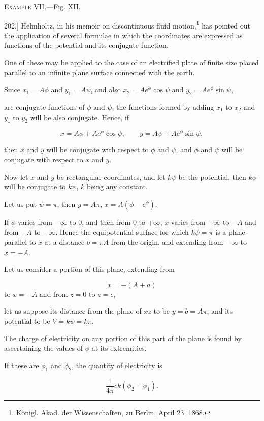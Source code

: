 \documentclass[11pt,a4paper]{article}
\begin{document}
\begin{center}
\textsc{Example VII.}---Fig. XII.
\end{center}

202.] Helmholtz, in his memoir on discontinuous fluid motion,\footnote{K\"onigl. Akad. der Wissenschaften, zu Berlin, April 23, 1868.}
has pointed out the application of several formulae in which the
coordinates are expressed as functions of the potential and its
conjugate function.

One of these may be applied to the case of an electrified plate of
finite size placed parallel to an infinite plane surface connected with
the earth.

Since $x_1=A\phi$ and $y_1=A\psi$, and also
$x_2=Ae^\phi\cos\psi$ and $y_2=Ae^\phi\sin\psi$,

are conjugate functions of $\phi$ and $\psi$, the functions formed by
adding $x_1$ to $x_2$ and $y_1$ to $y_2$ will be also conjugate.
Hence, if

\[
x=A\phi+Ae^\phi\cos\psi,\qquad
y=A\psi+Ae^\phi\sin\psi,
\]

then $x$ and $y$ will be conjugate with respect to $\phi$ and $\psi$,
and $\phi$ and $\psi$ will be conjugate with respect to $x$ and $y$.

Now let $x$ and $y$ be rectangular coordinates, and let $k\psi$ be the
potential, then $k\phi$ will be conjugate to $k\psi$, $k$ being any
constant.

Let us put $\psi=\pi$, then $y=A\pi$, $x=A(\phi-e^\phi)$.

If $\phi$ varies from $-\infty$ to 0, and then from 0 to $+\infty$,
$x$ varies from $-\infty$ to $-A$ and from $-A$ to $-\infty$. Hence the
equipotential surface for which $k\psi=\pi$ is a plane parallel to $x$
at a distance $b=\pi A$ from the origin, and extending from $-\infty$
to $x=-A$.

Let us consider a portion of this plane, extending from

\[
x=-(A+a)
\]
to $x=-A$ and from $z=0$ to $z=c$,

let us suppose its distance from the plane of $xz$ to be $y=b=A\pi$,
and its potential to be $V=k\psi=k\pi$.

The charge of electricity on any portion of this part of the plane is
found by ascertaining the values of $\phi$ at its extremities.

If these are $\phi_1$ and $\phi_2$, the quantity of electricity is

\[
\frac{1}{4\pi}ck(\phi_2-\phi_1).
\]
\end{document}
